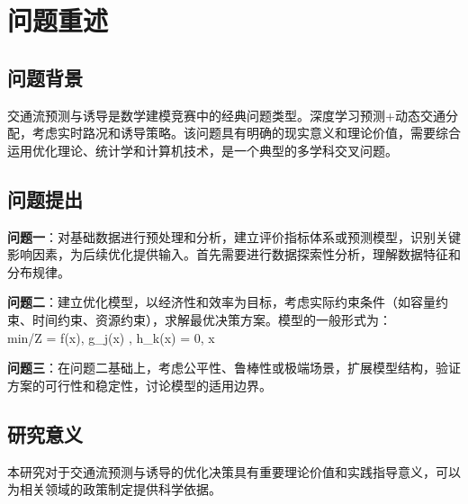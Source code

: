 \newpage
\section{问题重述}

\subsection{问题背景}
交通流预测与诱导是数学建模竞赛中的经典问题类型。深度学习预测+动态交通分配，考虑实时路况和诱导策略。该问题具有明确的现实意义和理论价值，需要综合运用优化理论、统计学和计算机技术，是一个典型的多学科交叉问题。

\subsection{问题提出}
\textbf{问题一}：对基础数据进行预处理和分析，建立评价指标体系或预测模型，识别关键影响因素，为后续优化提供输入。首先需要进行数据探索性分析，理解数据特征和分布规律。

\textbf{问题二}：建立优化模型，以经济性和效率为目标，考虑实际约束条件（如容量约束、时间约束、资源约束），求解最优决策方案。模型的一般形式为：
\\min/\max \quad Z = f(x), \quad {} \quad g_j(x) , \; h_k(x) = 0, \; x \in {}

\textbf{问题三}：在问题二基础上，考虑公平性、鲁棒性或极端场景，扩展模型结构，验证方案的可行性和稳定性，讨论模型的适用边界。

\subsection{研究意义}
本研究对于交通流预测与诱导的优化决策具有重要理论价值和实践指导意义，可以为相关领域的政策制定提供科学依据。
